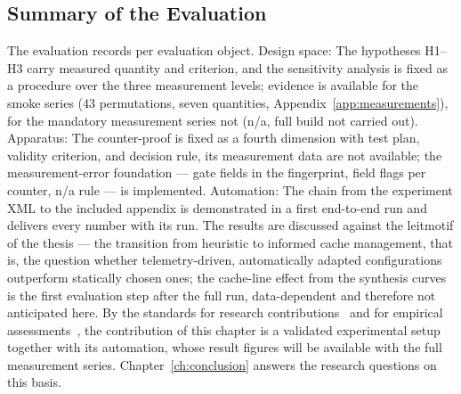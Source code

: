 \begin{nurlang}
\subsection{Summary of the Evaluation}\label{sec:eval-summary}
The evaluation records per evaluation object. Design space: The hypotheses H1--H3 carry measured
quantity and criterion, and the sensitivity analysis is fixed as a procedure over the three
measurement levels; evidence is available for the smoke series (43 permutations, seven quantities,
Appendix~\ref{app:measurements}), for the mandatory measurement series not (n/a, full build not
carried out). Apparatus: The counter-proof is fixed as a fourth dimension with test plan, validity
criterion, and decision rule, its measurement data are not available; the measurement-error
foundation --- gate fields in the fingerprint, field flags per counter, n/a rule --- is implemented.
Automation: The chain from the experiment XML to the included appendix is demonstrated in a first
end-to-end run and delivers every number with its run. The results are discussed against the
leitmotif of the thesis --- the transition from heuristic to informed cache management, that is, the
question whether telemetry-driven, automatically adapted configurations outperform statically chosen
ones; the cache-line effect from the synthesis curves is the first evaluation step after the full
run, data-dependent and therefore not anticipated here. By the standards for research
contributions~\cite{shaw2003writing} and for empirical assessments~\cite{blackburn2016truth}, the
contribution of this chapter is a validated experimental setup together with its automation, whose
result figures will be available with the full measurement series. Chapter~\ref{ch:conclusion}
answers the research questions on this basis.
\end{nurlang}
